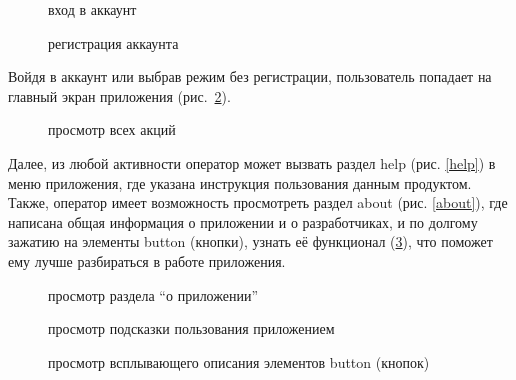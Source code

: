 \begin{figure}[h!]
    \centering
    \caption{\small{вход в аккаунт}}
    \label{login}
    \endminipage\hfill
    \caption{\small{регистрация аккаунта}}
    \label{register}
    \endminipage{}
\end{figure}

Войдя в аккаунт или выбрав режим без регистрации, пользователь попадает на
главный экран приложения (рис.~\ref{home}).

\begin{figure}[h!]
    \centering
    \caption{\small{просмотр всех акций}}
    \label{home}
\end{figure}

Далее, из любой активности оператор может вызвать раздел help (рис. \ref{help})
в меню приложения, где указана инструкция пользования данным продуктом. Также,
оператор имеет возможность просмотреть раздел about (рис. \ref{about}), где
написана общая информация о приложении и о разработчиках, и по долгому зажатию
на элементы button (кнопки), узнать её функционал (\ref{long_click}), что поможет ему лучше
разбираться в работе приложения.

\begin{figure}[h!]
    \centering
    \caption{\small{просмотр раздела ``о приложении''}}
    \label{about}
    \endminipage\hfill
    \caption{\small{просмотр подсказки пользования приложением}}
    \label{help}
    \endminipage\hfill
    \caption{\small{просмотр всплывающего описания элементов button (кнопок)}}
    \label{long_click}
    \endminipage{}
\end{figure}

\newpage

